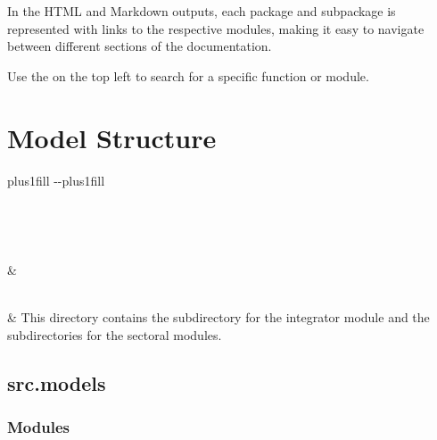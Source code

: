 \documentclass[letterpaper,10pt,english]{sphinxmanual}
\begin{document}
\sphinxAtStartPar
In the HTML and Markdown outputs, each package and subpackage is represented with links  to the respective modules, making it easy to navigate between different sections of the documentation.

\sphinxAtStartPar
Use the  on the top left to search for a specific function or module.


\section{Model Structure}
\label{\detokenize{index:model-structure}}

\begin{savenotes}
\sphinxatlongtablestart
\sphinxthistablewithglobalstyle
\sphinxthistablewithnovlinesstyle
\makeatletter
  \LTleft \@totalleftmargin plus1fill
  \LTright\dimexpr\columnwidth-\@totalleftmargin-\linewidth\relax plus1fill
\makeatother
\begin{longtable}{}
\sphinxtoprule
\endfirsthead

\\
\sphinxtoprule
\endhead

\sphinxbottomrule
{}\\
\endfoot

\endlastfoot
\sphinxtableatstartofbodyhook

\sphinxAtStartPar
{\hyperref[\detokenize{src.models:module-src.models}]{}}
&
\sphinxAtStartPar

\\
\sphinxhline
\sphinxAtStartPar
{\hyperref[\detokenize{src:module-src}]{}}
&
\sphinxAtStartPar
This directory contains the subdirectory for the integrator module and the subdirectories for the sectoral modules.
\\
\sphinxbottomrule
\end{longtable}
\sphinxtableafterendhook
\sphinxatlongtableend
\end{savenotes}

\sphinxstepscope


\subsection{src.models}
\label{\detokenize{src.models:module-src.models}}\label{\detokenize{src.models:src-models}}\label{\detokenize{src.models::doc}}\subsubsection*{Modules}
\end{document}
